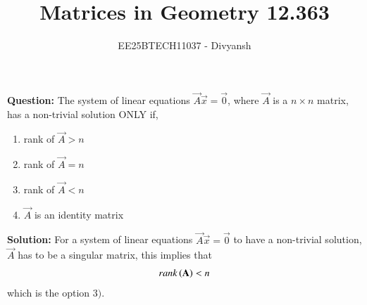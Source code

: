 \documentclass[journal,12pt,onecolumn]{IEEEtran}
\title{Matrices in Geometry 12.363}
\author{EE25BTECH11037 - Divyansh}
\theoremstyle{remark}
\begin{document}
\vspace{3cm}
\maketitle
{\let\newpage\relax\maketitle}
\textbf{Question: }
The system of linear equations $\vec{A}\vec{x}= \vec{0}$, where $\vec{A}$ is a $n\times n$ matrix, has a non-trivial solution ONLY if,
\begin{enumerate}
    \item rank of $\vec{A} > n$
    \item rank of $\vec{A} = n$
    \item rank of $\vec{A} < n$
    \item $\vec{A}$ is an identity matrix
\end{enumerate}
\vspace{2mm}


\textbf{Solution:}
For a system of linear equations $\vec{A}\vec{x}= \vec{0}$ to have a non-trivial solution, $\vec{A}$ has to be a singular matrix, this implies that
\begin{align}
    rank\left(\mathbf{A}\right) < n
\end{align}
which is the option $3)$.
\end{document}
